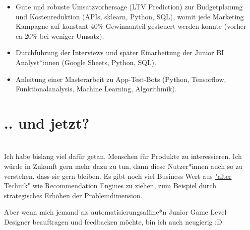 \documentclass[a4paper]{twentysecondcv} %
\begin{document}
\begin{twenty}
{\begin{itemize}
    \item Gute und robuste Umsatzvorhersage (LTV Prediction) zur Budgetplanung und Kostenreduktion (APIs, sklearn, Python, SQL), womit jede Marketing Kampagne auf konstant
    40\% Gewinnanteil gesteuert werden konnte (vorher ca 20\% bei weniger Umsatz). 
    \item Durchf\"uhrung der Interviews und sp\"ater Einarbeitung der Junior BI Analyst*innen (Google Sheets, Python, SQL).
    \item Anleitung einer Masterarbeit zu App-Test-Bots (Python, Tensorflow, Funktionalanalysis, Machine Learning, Algorithmik).
    \end{itemize}}
\end{twenty}

\section{.. und jetzt?}\\
Ich habe bislang viel daf\"ur getan, Menschen f\"ur Produkte zu interessieren. 
Ich w\"urde in Zukunft gern mehr dazu zu tun, dann diese Nutzer*innen auch so zu verstehen, dass sie 
gern bleiben. Es gibt noch viel Business Wert aus 
\href{https://en.wikipedia.org/wiki/Netflix_Prize}{"alter Technik"} 
wie Recommendation Engines zu ziehen, zum Beispiel durch strategisches Erh\"ohen der Problemdimension.

Aber wenn mich jemand als automatisierungsaffine*n Junior Game Level Designer beauftragen und 
feedbacken m\"ochte, bin ich auch neugierig :D
\end{document}
